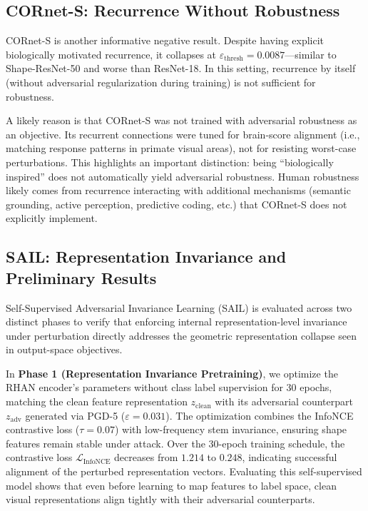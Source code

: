 \documentclass[12pt,a4paper]{article}
\begin{document}
\subsection{CORnet-S: Recurrence Without Robustness}

CORnet-S is another informative negative result. Despite having explicit
biologically motivated recurrence, it collapses at
$\varepsilon_{\text{thresh}}{=}0.0087$---similar to Shape-ResNet-50 and worse than
ResNet-18. In this setting, recurrence by itself (without adversarial
regularization during training) is not sufficient for robustness.

A likely reason is that CORnet-S was not trained with adversarial robustness as
an objective. Its recurrent connections were tuned for brain-score alignment
(i.e., matching response patterns in primate visual areas), not for resisting
worst-case perturbations. This highlights an important distinction: being
``biologically inspired'' does not automatically yield adversarial robustness.
Human robustness likely comes from recurrence interacting with additional
mechanisms (semantic grounding, active perception, predictive coding, etc.) that
CORnet-S does not explicitly implement.

\subsection{SAIL: Representation Invariance and Preliminary Results}

Self-Supervised Adversarial Invariance Learning (SAIL) is evaluated across two distinct phases to verify that enforcing internal representation-level invariance under perturbation directly addresses the geometric representation collapse seen in output-space objectives. 

In \textbf{Phase 1 (Representation Invariance Pretraining)}, we optimize the RHAN encoder's parameters without class label supervision for 30 epochs, matching the clean feature representation $z_{\text{clean}}$ with its adversarial counterpart $z_{\text{adv}}$ generated via PGD-5 ($\varepsilon=0.031$). The optimization combines the InfoNCE contrastive loss ($\tau=0.07$) with low-frequency stem invariance, ensuring shape features remain stable under attack. Over the 30-epoch training schedule, the contrastive loss $\mathcal{L}_{\text{InfoNCE}}$ decreases from $1.214$ to $0.248$, indicating successful alignment of the perturbed representation vectors. Evaluating this self-supervised model shows that even before learning to map features to label space, clean visual representations align tightly with their adversarial counterparts.
\end{document}
